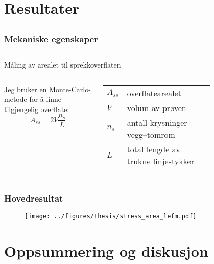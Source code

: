 \documentclass[utf8x, notes]{beamer}
\begin{document}
\section{Resultater}

\subsection{}
\begin{frame}
\frametitle{Mekaniske egenskaper}
\end{frame}

\subsection{}
\begin{frame}{Måling av arealet til sprekkoverflaten}
\begin{columns}[c]
Jeg bruker en Monte-Carlo-metode for å finne tilgjengelig overflate:
\begin{equation*}
A_{ss} = 2V\frac{n_s}{L}
\end{equation*}
\begin{table}
\begin{tabular}{ll}
$A_{ss}$ & overflatearealet \\
$V$ & volum av prøven \\
$n_s$ & antall krysninger vegg--tomrom \\
$L$ & total lengde av trukne linjestykker 
\end{tabular}
\end{table}

	\begin{figure}
 	\centering
	\end{figure}
	\end{columns}
\end{frame}

\subsection{}
\begin{frame}
\frametitle{Hovedresultat}
\begin{figure}
\texttt{[image: ../figures/thesis/stress\_area\_lefm.pdf]}
\end{figure}

\end{frame}


\section{Oppsummering og diskusjon}
\end{document}
